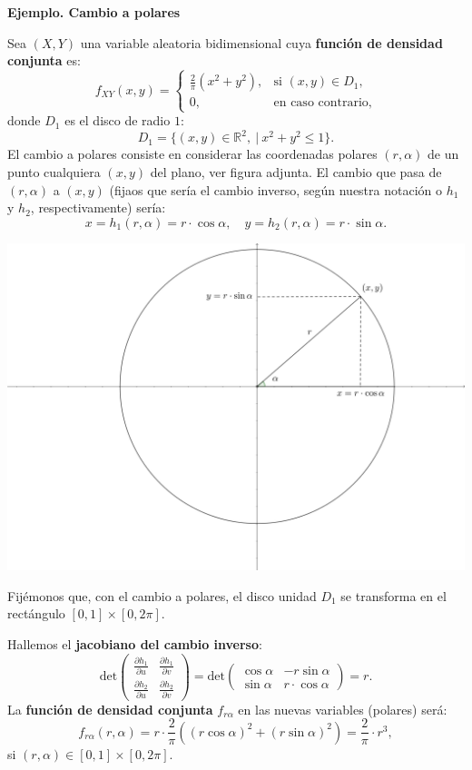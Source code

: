 \documentclass[]{book}
\begin{document}
\textbf{Ejemplo. Cambio a polares}

Sea \((X,Y)\) una variable aleatoria bidimensional cuya \textbf{función de densidad conjunta} es:
\[
f_{XY}(x,y)=
\begin{cases}
\frac{2}{\pi}\left(x^2 + y^2\right), & \mbox{si }(x,y)\in D_1, \\
0, & \mbox{en caso contrario,}
\end{cases}
\]
donde \(D_1\) es el disco de radio \(1\):
\[
D_1 = \{(x,y)\in\mathbb{R}^2,\ | \ x^2+y^2\leq 1\}.
\]
El cambio a polares consiste en considerar las coordenadas polares \((r,\alpha)\) de un punto cualquiera \((x,y)\) del plano, ver figura adjunta. El cambio que pasa de \((r,\alpha)\) a \((x,y)\) (fijaos que sería el cambio inverso, según nuestra notación o \(h_1\)y \(h_2\), respectivamente) sería:
\[
x=h_1(r,\alpha)=r\cdot \cos\alpha,\quad y=h_2(r,\alpha)=r\cdot \sin\alpha.
\]

\includegraphics{Images/Polares.png}

Fijémonos que, con el cambio a polares, el disco unidad \(D_1\) se transforma en el rectángulo \([0,1]\times [0,2\pi]\).

Hallemos el \textbf{jacobiano del cambio inverso}:
\[
\mathrm{det}\begin{pmatrix}\frac{\partial h_1}{\partial u} & \frac{\partial h_1}{\partial v}\\ \frac{\partial h_2}{\partial u} & \frac{\partial h_2}{\partial v}\end{pmatrix} =\mathrm{det}\begin{pmatrix}\cos\alpha & -r\sin\alpha\\ \sin\alpha & r\cdot\cos\alpha\end{pmatrix} = r.
\]
La \textbf{función de densidad conjunta} \(f_{r\alpha}\) en las nuevas variables (polares) será:
\[
f_{r\alpha}(r,\alpha)=r\cdot \frac{2}{\pi}\left((r\cos\alpha)^2+(r\sin\alpha)^2\right)=\frac{2}{\pi}\cdot r^3,
\]
si \((r,\alpha)\in [0,1]\times [0,2\pi]\).
\end{document}
